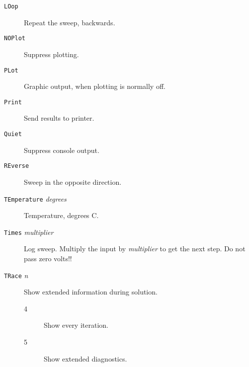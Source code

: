 \begin{description}



\item[{\tt LOop}] Repeat the sweep, backwards.




\item[{\tt NOPlot}] Suppress plotting.

\item[{\tt PLot}] Graphic output, when plotting is
normally off.

\item[{\tt Print}] Send results to printer.

\item[{\tt Quiet}] Suppress console output.


\item[{\tt REverse}] Sweep in the opposite direction.


\item[{\tt TEmperature} {\it degrees}] Temperature,
degrees C.

\item[{\tt Times} {\it multiplier}] Log sweep.  Multiply
the input by {\it multiplier} to get the next step.  Do
not pass zero volts!!

\item[{\tt TRace} {\it n}] Show extended information during solution.
\begin{description}
\item[4] Show every iteration.
\item[5] Show extended diagnostics.
\end{description}


\end{description}
